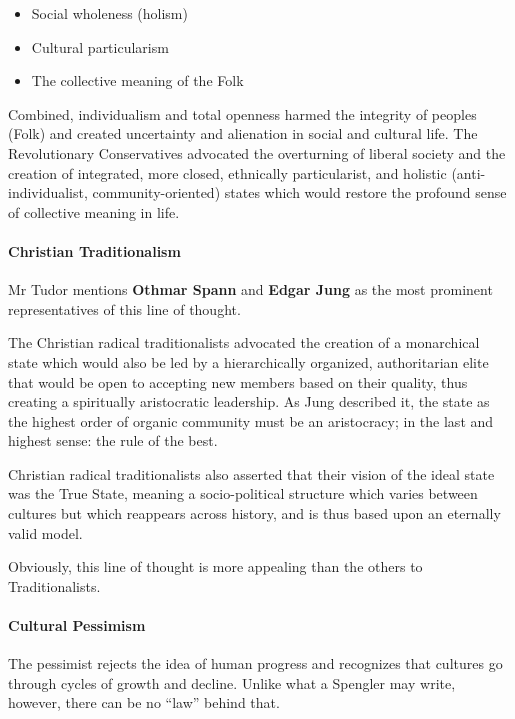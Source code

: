 \begin{itemize}
\item Social wholeness (holism) 
\item Cultural particularism 
\item The collective meaning of the Folk 
\end{itemize}
\begin{quotex}

Combined, individualism and total openness harmed the integrity of peoples (Folk) and created uncertainty and alienation
in social and cultural life. The Revolutionary Conservatives advocated the overturning of liberal society and the
creation of integrated, more closed, ethnically particularist, and holistic (anti-individualist, community-oriented)
states which would restore the profound sense of collective meaning in life. 

\end{quotex}

\paragraph{Christian Traditionalism}
Mr Tudor mentions \textbf{Othmar Spann} and \textbf{Edgar Jung} as the most prominent representatives of this line of
thought.

\begin{quotex}
The Christian radical traditionalists advocated the creation of a monarchical state which would also be led by a
hierarchically organized, authoritarian elite that would be open to accepting new members based on their quality, thus
creating a spiritually aristocratic leadership. As Jung described it, the state as the highest order of organic
community must be an aristocracy; in the last and highest sense: the rule of the best. 

Christian radical traditionalists also asserted that their vision of the ideal state was the True State, meaning a
socio-political structure which varies between cultures but which reappears across history, and is thus based upon an
eternally valid model. 

\end{quotex}
Obviously, this line of thought is more appealing than the others to Traditionalists.

\paragraph{Cultural Pessimism}
The pessimist rejects the idea of human progress and recognizes that cultures go through cycles of growth and decline.
Unlike what a Spengler may write, however, there can be no “law” behind that.

